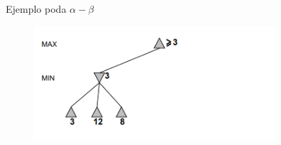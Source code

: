     \begin{frame}{Ejemplo poda $\alpha-\beta$}
        \begin{figure}\includegraphics[width =90mm]{14img-cap6.PNG}\end{figure}
    \end{frame}